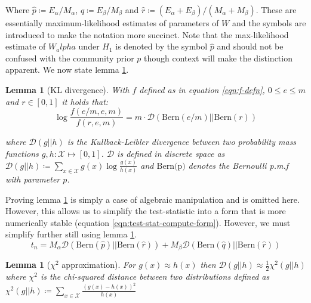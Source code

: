 \documentclass[11pt]{article}
\newcommand{\Xcal}{\mathcal{X}}
\newcommand{\kl}{\mathcal{D}}
\newtheorem{lemma}[theorem]{Lemma}
\begin{document}
\begin{multicols*}{2}
Where $\hat{p} \coloneqq E_\alpha / M_\alpha$, $\hat{q} \coloneqq E_\beta / M_\beta$ and $\hat{r} \coloneqq (E_\alpha + E_\beta) / (M_\alpha + M_\beta)$. These are essentially maximum-likelihood estimates of parameters of $W$ and the symbols are introduced to make the notation more succinct. Note that the max-likelihood estimate of $W_alpha$ under $H_1$ is denoted by the symbol $\hat{p}$ and should not be confused with the community prior $p$ though context will make the distinction apparent. We now state lemma \ref{lem:kl-div}.

\begin{lemma}[KL divergence]
	With $f$ defined as in equation \ref{eqn:f-defn}, $0 \leq e \leq m$ and $r \in [0, 1]$ it holds that:
	\begin{equation*}
		\log \frac{f(e/m, e, m)}{f(r, e, m)} = m \cdot \kl \left( \textrm{Bern}(e/m) || \textrm{Bern}(r) \right)
	\end{equation*}

	where $\kl(g || h)$ is the Kullback-Leibler divergence between two probability mass functions $g, h: \Xcal \mapsto [0, 1]$. $\kl$ is defined in discrete space as $\kl(g || h) \coloneqq \sum_{x \in \Xcal} g(x) \log \frac{g(x)}{h(x)}$ and $\textrm{Bern(p)}$ denotes the Bernoulli p.m.f with parameter $p$.
	\label{lem:kl-div}
\end{lemma}

Proving lemma \ref{lem:kl-div} is simply a case of algebraic manipulation and is omitted here. However, this allows us to simplify the test-statistic into a form that is more numerically stable (equation \ref{eqn:test-stat-compute-form}). However, we must simplify further still using lemma \ref{lem:kl-approx-chi}.
%
\begin{equation}
	t_n = M_\alpha \kl\left( \textrm{Bern}(\hat{p}) || \textrm{Bern}(\hat{r})\right) + 
	M_\beta \kl\left( \textrm{Bern}(\hat{q}) || \textrm{Bern}(\hat{r})\right)
	\label{eqn:test-stat-compute-form}
\end{equation}

%
\begin{lemma}[$\chi^2$ approximation]
	\label{lem:kl-approx-chi}
	For $g(x) \approx h(x)$ then $\kl(g || h) \approx \frac{1}{2} \chi^2(g || h)$ where $\chi^2$ is the chi-squared distance between two distributions defined as $\chi^2(g || h) \coloneqq \sum_{x \in \Xcal} \frac{(g(x)-h(x))^2}{h(x)}$ 
\end{lemma}


\end{multicols*}
\end{document}
